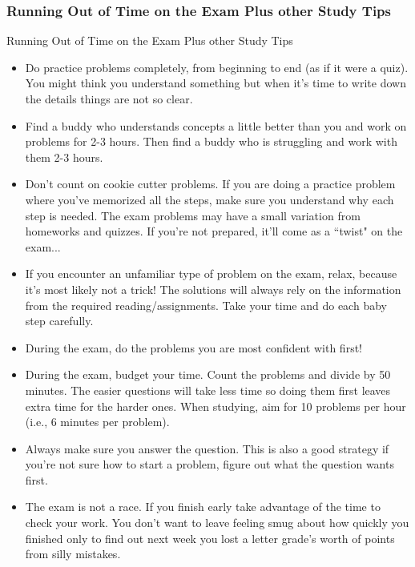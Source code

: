 \documentclass[cal1spr16Lectures.tex]{subfiles}
\begin{document}
\subsubsection{Running Out of Time on the Exam Plus other Study Tips}
\begin{frame}[allowframebreaks]{\small Running Out of Time on the Exam Plus other Study Tips}\footnotesize
\begin{itemize}
\item Do practice problems completely, from beginning to end (as if it were a quiz).  You might think you understand something but when it's time to write down the details things are not so clear.  
\item Find a buddy who understands concepts a little better than you and work on problems for 2-3 hours.  Then find a buddy who is struggling and work with them 2-3 hours.  %
\item Don't count on cookie cutter problems.  If you are doing a practice problem where you've memorized all the steps, make sure you understand why each step is needed.  The exam problems may have a small variation from homeworks and quizzes.  If you're not prepared, it'll come as a ``twist" on the exam...
%
\framebreak
\item If you encounter an unfamiliar type of problem on the exam, relax, because it's most likely not a trick!  The solutions will always rely on the information from the required reading/assignments.  Take your time and do each baby step carefully.  
\item During the exam, do the problems you are most confident with first!  %
\item During the exam, budget your time.  Count the problems and divide by 50 minutes.  The easier questions will take less time so doing them first leaves extra time for the harder ones.  When studying, aim for 10 problems per hour (i.e., 6 minutes per problem).
%
\framebreak
\item Always make sure you \alert{answer the question}.  This is also a good strategy if you're not sure how to start a problem, figure out what the question wants first.
\item The exam is not a race.  If you finish early take advantage of the time to check your work.  You don't want to leave feeling smug about how quickly you finished only to find out next week you lost a letter grade's worth of points from silly mistakes.
\end{itemize}
\end{frame}
\end{document}
